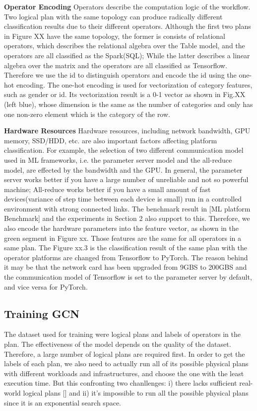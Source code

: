 \textbf{Operator Encoding}  
Operators describe the computation logic of the workflow. 
Two logical plan with the same topology can produce radically different classification results due to their different operators. 
Although the first two plans in Figure XX have the same topology, the former is consists of relational operators, which describes the relational algebra over the Table model, and the operators are all classified as the Spark(SQL); 
While the latter describes a linear algebra over the matrix and the operators are all classified as Tensorflow. 
Therefore we use the id to distinguish operators and encode the id using the one-hot encoding. 
The one-hot encoding is used for vectorization of category features, such as gender or id. 
Its vectorization result is a 0-1 vector as shown in Fig.XX (left blue), whose dimension is the same as the number of categories and only has one non-zero element which is the category of the row.


\textbf{Hardware Resources}
Hardware resources, including network bandwidth, GPU memory, SSD/HDD, etc. are also important factors affecting platform classification. 
For example, the selection of two different communication model used in ML frameworks, i.e. the parameter server model and the all-reduce model, are effected by the bandwidth and the GPU. 
In general, the parameter server works better if you have a large number of unreliable and not so powerful machine;
All-reduce works better if you have a small amount of fast devices(variance of step time between each device is small) run in a controlled environment with strong connected links. 
The benchmark result in [ML platform Benchmark] and the experiments in Section 2 also support to this. 
Therefore, we also encode the hardware parameters into the feature vector, as shown in the green segment in Figure xx. 
Those features are the same for all operators in a same plan. 
The Figure xx.3 is the classification result of the same plan with the operator platforms are changed from Tensorflow to PyTorch. 
The reason behind it may be that the network card has been upgraded from 9GBS to 200GBS and the communication model of Tensorflow is set to the parameter server by default, and vice versa for PyTorch. 

\subsection{Training GCN}
The dataset used for training were logical plans and labels of operators in the plan. 
The effectiveness of the model depends on the quality of the dataset. 
Therefore, a large number of logical plans are required first. 
In order to get the labels of each plan, we also need to actually run all of its possible physical plans with different workloads and infrastructures, and choose the one with the least execution time. 
But this confronting two chanllenges: 
i) there lacks sufficient real-world logical plans [] and 
ii) it's impossible to run all the possible physical plans since it is an exponential search space. 

